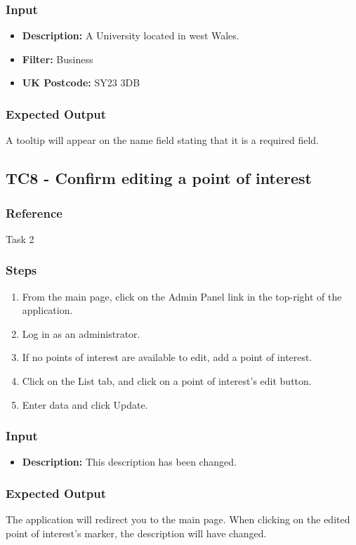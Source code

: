 \subsubsection{Input}
\begin{itemize}
	\item \textbf{Description: } A University located in west Wales.
	\item \textbf{Filter: } Business
	\item \textbf{UK Postcode: } SY23 3DB
\end{itemize}
\subsubsection{Expected Output}
A tooltip will appear on the name field stating that it is a required field.
\subsection{TC8 - Confirm editing a point of interest}

\subsubsection{Reference}

Task 2

\subsubsection{Steps}
\begin{enumerate}
		\item From the main page, click on the Admin Panel link in the top-right of the application.
	\item Log in as an administrator.
	\item If no points of interest are available to edit, add a point of interest.
	\item Click on the List tab, and click on a point of interest's edit button.
	\item Enter data and click Update.
\end{enumerate}	
\subsubsection{Input}
\begin{itemize}
\item \textbf{Description: } This description has been changed.
\end{itemize}
\subsubsection{Expected Output}
The application will redirect you to the main page. When clicking on the edited point of interest's marker, the description will have changed.
